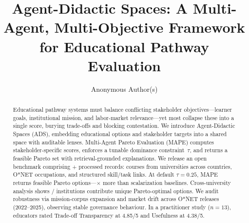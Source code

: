\documentclass{article}
\title{Agent-Didactic Spaces: A Multi-Agent, Multi-Objective Framework for Educational Pathway Evaluation}
\author{
Anonymous Author(s)
}
\newcommand{\ADS}{\textsc{ADS}\xspace}
\newcommand{\MAPE}{\textsc{MAPE}\xspace}
\newcommand{\IndustryPartner}{\textit{industry partner (anonymized)}}
\begin{document}
\maketitle

\begin{abstract}
Educational pathway systems must balance conflicting stakeholder objectives---learner goals, institutional mission, and labor-market relevance---yet most collapse these into a single score, burying trade-offs and blocking contestation.
We introduce Agent-Didactic Spaces (\ADS), embedding educational options and stakeholder targets into a shared space with auditable lenses. Multi-Agent Pareto Evaluation (\MAPE) computes stakeholder-specific scores, enforces a tunable dominance constraint~$\tau$, and returns a feasible Pareto set with retrieval-grounded explanations.
We release an open benchmark comprising {\HeadlineRecords}+ processed records: {\NumCourses} courses from {\NumUniversities} universities across {\NumCountries} countries, {\NumOccupations} O*NET occupations, and {\NumAttributeRecords} structured skill/task links.
At default $\tau{=}0.25$, \MAPE returns {\MainParetoSize} feasible Pareto options---{\ParetoVsBaselineRatio}$\times$ more than scalarization baselines. Cross-university analysis shows {\NumUnisContributing}/{\NumUniversities} institutions contribute unique Pareto-optimal options. We audit robustness via mission-corpus expansion and market drift across O*NET releases (2022--2025), observing stable governance behaviour. In a practitioner study ($n{=}13$), educators rated Trade-off Transparency at 4.85/5 and Usefulness at 4.38/5.
\end{abstract}


\end{document}
